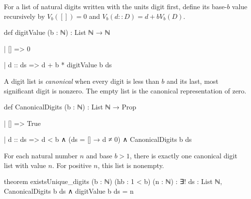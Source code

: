 \begin{definition}
  For a list of natural digits written with the units digit first, define its base-$b$ value
  recursively by $V_b([])=0$ and $V_b(d::D)=d+bV_b(D)$.

  \begin{lean}
    def digitValue (b : ℕ) : List ℕ → ℕ

      | [] => 0

      | d :: ds => d + b * digitValue b ds
  \end{lean}
\end{definition}

\begin{definition}
  A digit list is \emph{canonical} when every digit is less than $b$ and its last, most
  significant digit is nonzero.
  The empty list is the canonical representation of zero.

  \begin{lean}
    def CanonicalDigits (b : ℕ) : List ℕ → Prop

      | [] => True

      | d :: ds => d < b ∧ (ds = [] → d ≠ 0) ∧ CanonicalDigits b ds
  \end{lean}
\end{definition}

\begin{theorem}
  \label{ent:thm:existsunique-digits}
  For each natural number $n$ and base $b>1$, there is exactly one canonical digit list with value
  $n$.
  For positive $n$, this list is nonempty.

  \begin{lean}
    theorem existsUnique_digits (b : ℕ) (hb : 1 < b) (n : ℕ) :
        ∃! ds : List ℕ, CanonicalDigits b ds ∧ digitValue b ds = n
  \end{lean}
\end{theorem}

